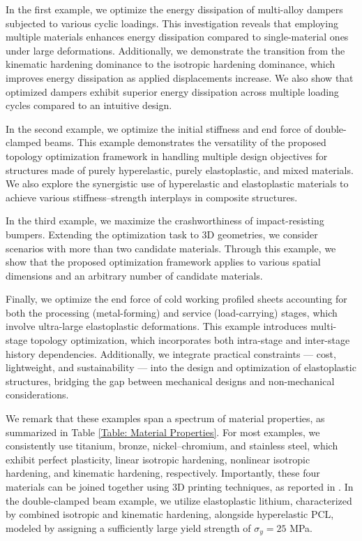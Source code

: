 \documentclass[preprint,11pt]{elsarticle}
\theoremstyle{definition}
\begin{document}
In the first example, we optimize the energy dissipation of multi-alloy dampers subjected to various cyclic loadings. This investigation reveals that employing multiple materials enhances energy dissipation compared to single-material ones under large deformations. Additionally, we demonstrate the transition from the kinematic hardening dominance to the isotropic hardening dominance, which improves energy dissipation as applied displacements increase. We also show that optimized dampers exhibit superior energy dissipation across multiple loading cycles compared to an intuitive design.

In the second example, we optimize the initial stiffness and end force of double-clamped beams. This example demonstrates the versatility of the proposed topology optimization framework in handling multiple design objectives for structures made of purely hyperelastic, purely elastoplastic, and mixed materials. We also explore the synergistic use of hyperelastic and elastoplastic materials to achieve various stiffness--strength interplays in composite structures.

In the third example, we maximize the crashworthiness of impact-resisting bumpers. Extending the optimization task to 3D geometries, we consider scenarios with more than two candidate materials. Through this example, we show that the proposed optimization framework applies to various spatial dimensions and an arbitrary number of candidate materials.

Finally, we optimize the end force of cold working profiled sheets accounting for both the processing (metal-forming) and service (load-carrying) stages, which involve ultra-large elastoplastic deformations. This example introduces multi-stage topology optimization, which incorporates both intra-stage and inter-stage history dependencies. Additionally, we integrate practical constraints --- cost, lightweight, and sustainability --- into the design and optimization of elastoplastic structures, bridging the gap between mechanical designs and non-mechanical considerations.

We remark that these examples span a spectrum of material properties, as summarized in Table \ref{Table: Material Properties}. For most examples, we consistently use titanium, bronze, nickel--chromium, and stainless steel, which exhibit perfect plasticity, linear isotropic hardening, nonlinear isotropic hardening, and kinematic hardening, respectively. Importantly, these four materials can be joined together using 3D printing techniques, as reported in \citet{wei_overview_2020, wei_cu10sn_2022}. In the double-clamped beam example, we utilize elastoplastic lithium, characterized by combined isotropic and kinematic hardening, alongside hyperelastic PCL, modeled by assigning a sufficiently large yield strength of $\sigma_y = 25$ MPa.
\end{document}
